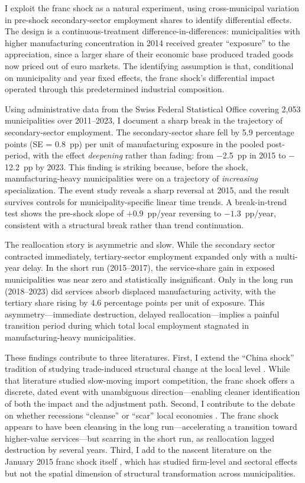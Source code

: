 \documentclass[12pt]{article}
\begin{document}
I exploit the franc shock as a natural experiment, using cross-municipal variation in pre-shock secondary-sector employment shares to identify differential effects. The design is a continuous-treatment difference-in-differences: municipalities with higher manufacturing concentration in 2014 received greater ``exposure'' to the appreciation, since a larger share of their economic base produced traded goods now priced out of euro markets. The identifying assumption is that, conditional on municipality and year fixed effects, the franc shock's differential impact operated through this predetermined industrial composition.

Using administrative data from the Swiss Federal Statistical Office covering 2,053 municipalities over 2011--2023, I document a sharp break in the trajectory of secondary-sector employment. The secondary-sector share fell by 5.9 percentage points (SE = 0.8~pp) per unit of manufacturing exposure in the pooled post-period, with the effect \textit{deepening} rather than fading: from $-$2.5~pp in 2015 to $-$12.2~pp by 2023. This finding is striking because, before the shock, manufacturing-heavy municipalities were on a trajectory of \textit{increasing} specialization. The event study reveals a sharp reversal at 2015, and the result survives controls for municipality-specific linear time trends. A break-in-trend test shows the pre-shock slope of $+0.9$~pp/year reversing to $-1.3$~pp/year, consistent with a structural break rather than trend continuation.

The reallocation story is asymmetric and slow. While the secondary sector contracted immediately, tertiary-sector employment expanded only with a multi-year delay. In the short run (2015--2017), the service-share gain in exposed municipalities was near zero and statistically insignificant. Only in the long run (2018--2023) did services absorb displaced manufacturing activity, with the tertiary share rising by 4.6 percentage points per unit of exposure. This asymmetry---immediate destruction, delayed reallocation---implies a painful transition period during which total local employment stagnated in manufacturing-heavy municipalities.

These findings contribute to three literatures. First, I extend the ``China shock'' tradition of studying trade-induced structural change at the local level \citep{autor2013china, autor2016china, dix-carneiro2017trade, pierce2016surprisingly}. While that literature studied slow-moving import competition, the franc shock offers a discrete, dated event with unambiguous direction---enabling cleaner identification of both the impact and the adjustment path. Second, I contribute to the debate on whether recessions ``cleanse'' or ``scar'' local economies \citep{caballero1996jobdestruction, davis2001sectoral}. The franc shock appears to have been cleansing in the long run---accelerating a transition toward higher-value services---but scarring in the short run, as reallocation lagged destruction by several years. Third, I add to the nascent literature on the January 2015 franc shock itself \citep{kaufmann2018labor, auer2021exchange}, which has studied firm-level and sectoral effects but not the spatial dimension of structural transformation across municipalities.
\end{document}
